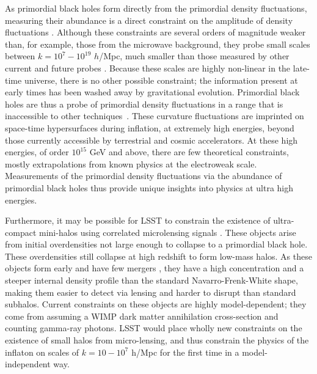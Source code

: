 As primordial black holes form directly from the primordial density fluctuations, measuring their abundance is a direct constraint on the amplitude of density fluctuations \citep{Clesse:2015}. Although these constraints are several orders of magnitude weaker than, for example, those from the microwave background, they probe small scales between $k = 10^{7} - 10^{19}$ $h$/Mpc, much smaller than those measured by other current and future probes \citep{Bringmann:2012}. Because these scales are highly non-linear in the late-time universe, there is no other possible constraint; the information present at early times has been washed away by gravitational evolution. Primordial black holes are thus a probe of primordial density fluctuations in a range that is inaccessible to other techniques~\citep{Bellido:2017,Bellido:2018}. These curvature fluctuations are imprinted on space-time hypersurfaces during inflation, at extremely high energies, beyond those currently accessible by terrestrial and cosmic accelerators. 
At these high energies, of order $10^{15}$ GeV and above, there are few theoretical constraints, mostly extrapolations from known physics at the electroweak scale. Measurements of the primordial density fluctuations via the abundance of primordial black holes thus provide unique insights into physics at ultra high energies. %


Furthermore, it may be possible for LSST to constrain the existence of ultra-compact mini-halos using correlated microlensing signals \citep{erickcek2011,li2012}. These objects arise from initial overdensities not large enough to collapse to a primordial black hole. These overdensities still collapse at high redshift to form low-mass halos. As these objects form early and have few mergers \citep{Bringmann:2012,Delos:2018}, they have a high concentration and a steeper internal density profile than the standard Navarro-Frenk-White shape, making them easier to detect via lensing and harder to disrupt than standard subhalos. Current constraints on these objects are highly model-dependent; they come from assuming a WIMP dark matter annihilation cross-section and counting gamma-ray photons. LSST would place wholly new constraints on the existence of small halos from micro-lensing, and thus constrain the physics of the inflaton on scales of $k = 10 - 10^7 $ h/Mpc for the first time in a model-independent way.

